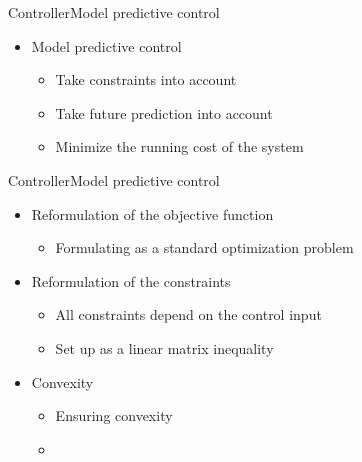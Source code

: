 \begin{frame}{Controller}{Model predictive control}
\begin{itemize}
	\item<1-> Model predictive control 
	 	\begin{itemize}
	 	\item<1-> Take constraints into account	
	 	\item<1-> Take future prediction into account 
	 	\item<1-> Minimize the running cost of the system
	 	\end{itemize}
\end{itemize}

\begin{figure}[H]
\centering
 
\end{figure}
\end{frame}

\begin{frame}{Controller}{Model predictive control}
\begin{itemize}
	\item<1-> Reformulation of the objective function 
	 	\begin{itemize}
	 	\item<1-> Formulating as a standard optimization problem 
	 	\end{itemize}
	\item<1-> Reformulation of the constraints 
	 	\begin{itemize}
	 	\item<1-> All constraints depend on the control input 
	 	\item<1-> Set up as a linear matrix inequality 
	 	\end{itemize}
	\item<1-> Convexity 
	 	\begin{itemize}
	 	\item<1-> Ensuring convexity 
	 	\item<1-> 
	 	\end{itemize}
\end{itemize}

\end{frame}